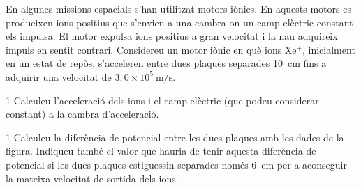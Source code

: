 En algunes missions espacials s'han utilitzat motors iònics. En aquests motors es produeixen ions positius que s'envien a una cambra on un camp elèctric constant els impulsa. El motor expulsa ions positius a gran velocitat i la nau adquireix impuls en sentit contrari. Considereu un motor iònic en què ions Xe$^{+}$, inicialment en un estat de repòs, s'acceleren entre dues plaques separades 10~cm fins a adquirir una velocitat de $3,0\times 10^{5}\ \mathrm{m/s}$.


\begin{apartat}{1}
Calculeu l'acceleració dels ions i el camp elèctric (que podeu considerar constant) a la cambra d'acceleració.
\end{apartat}

\begin{apartat}{1}
Calculeu la diferència de potencial entre les dues plaques amb les dades de la figura. Indiqueu també el valor que hauria de tenir aquesta diferència de potencial si les dues plaques estiguessin separades només 6~cm per a aconseguir la mateixa velocitat de sortida dels ions.
\end{apartat}


